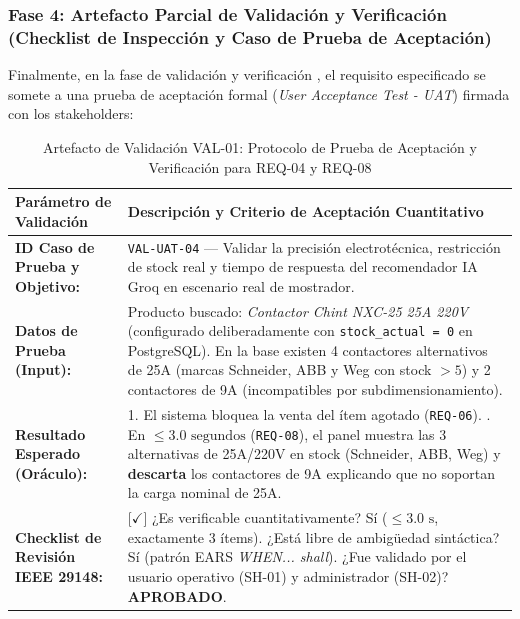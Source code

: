 \subsubsection{Fase 4: Artefacto Parcial de Validación y Verificación (Checklist de Inspección y Caso de Prueba de Aceptación)}
Finalmente, en la fase de validación y verificación \cite{ieee29148, pohl2025}, el requisito especificado se somete a una prueba de aceptación formal (\textit{User Acceptance Test - UAT}) firmada con los stakeholders:

\begin{table}[htbp]
\centering
\scriptsize
\caption{Artefacto de Validación VAL-01: Protocolo de Prueba de Aceptación y Verificación para REQ-04 y REQ-08}
\label{tab:artefacto_validacion}
\begin{tabularx}{\textwidth}{l Y}
\toprule
\textbf{Parámetro de Validación} & \textbf{Descripción y Criterio de Aceptación Cuantitativo} \\
\midrule
\textbf{ID Caso de Prueba y Objetivo:} & \texttt{VAL-UAT-04} --- Validar la precisión electrotécnica, restricción de stock real y tiempo de respuesta del recomendador IA Groq en escenario real de mostrador. \\
\textbf{Datos de Prueba (Input):} & Producto buscado: \textit{Contactor Chint NXC-25 25A 220V} (configurado deliberadamente con \texttt{stock\_actual = 0} en PostgreSQL). En la base existen 4 contactores alternativos de 25A (marcas Schneider, ABB y Weg con stock $> 5$) y 2 contactores de 9A (incompatibles por subdimensionamiento). \\
\textbf{Resultado Esperado (Oráculo):} & 1. El sistema bloquea la venta del ítem agotado (\texttt{REQ-06}). . En $\le 3.0\text{ segundos}$ (\texttt{REQ-08}), el panel muestra las 3 alternativas de 25A/220V en stock (Schneider, ABB, Weg) y \textbf{descarta} los contactores de 9A explicando que no soportan la carga nominal de 25A. \\
\textbf{Checklist de Revisión IEEE 29148:} & [$\checkmark$] ¿Es verificable cuantitativamente? Sí ($\le 3.0\text{ s}$, exactamente 3 ítems). \newline
[$\checkmark$] ¿Está libre de ambigüedad sintáctica? Sí (patrón EARS \textit{WHEN... shall}). \newline
[$\checkmark$] ¿Fue validado por el usuario operativo (SH-01) y administrador (SH-02)? \textbf{APROBADO}. \\
\bottomrule
\end{tabularx}
\end{table}

